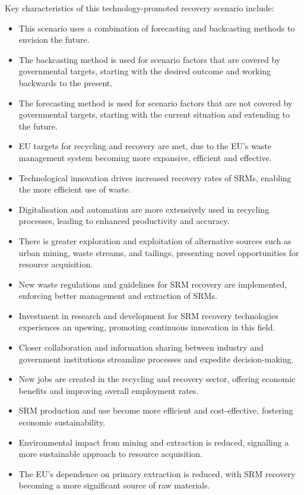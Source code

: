 Key characteristics of this technology-promoted recovery scenario include:

\begin{itemize}
  \item This scenario uses a combination of forecasting and backcasting methods to envision the future.
  \item The backcasting method is used for scenario factors that are covered by governmental targets, starting with the desired outcome and working backwards to the present.
  \item The forecasting method is used for scenario factors that are not covered by governmental targets, starting with the current situation and extending to the future.
  \item EU targets for recycling and recovery are met, due to the EU's waste management system becoming more expansive, efficient and effective.
  \item Technological innovation drives increased recovery rates of SRMs, enabling the more efficient use of waste.
  \item Digitalisation and automation are more extensively used in recycling processes, leading to enhanced productivity and accuracy.
  \item There is greater exploration and exploitation of alternative sources such as urban mining, waste streams, and tailings, presenting novel opportunities for resource acquisition.
  \item New waste regulations and guidelines for SRM recovery are implemented, enforcing better management and extraction of SRMs.
  \item Investment in research and development for SRM recovery technologies experiences an upswing, promoting continuous innovation in this field.
  \item Closer collaboration and information sharing between industry and government institutions streamline processes and expedite decision-making.
  \item New jobs are created in the recycling and recovery sector, offering economic benefits and improving overall employment rates.
  \item SRM production and use become more efficient and cost-effective, fostering economic sustainability.
  \item Environmental impact from mining and extraction is reduced, signalling a more sustainable approach to resource acquisition.
  \item The EU's dependence on primary extraction is reduced, with SRM recovery becoming a more significant source of raw materials.
\end{itemize}

